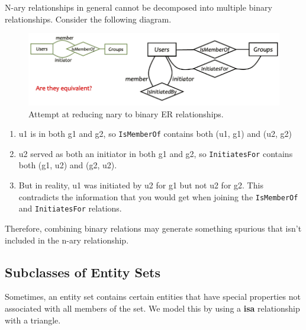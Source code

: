 \documentclass{article}
\begin{document}
      \begin{example}
        N-ary relationships in general cannot be decomposed into multiple binary relationships. Consider the following diagram. 
        \begin{figure}[H]
          \centering 
          \includegraphics[scale=0.4]{img/nary_vs_binary.png}
          \caption{Attempt at reducing nary to binary ER relationships. } 
          \label{fig:}
        \end{figure}
        \begin{enumerate}
          \item u1 is in both g1 and g2, so \texttt{IsMemberOf} contains both (u1, g1) and (u2, g2)
          \item u2 served as both an initiator in both g1 and g2, so \texttt{InitiatesFor} contains both (g1, u2) and (g2, u2). 
          \item But in reality, u1 was initiated by u2 for g1 but not u2 for g2. This contradicts the information that you would get when joining the \texttt{IsMemberOf} and \texttt{InitiatesFor} relations. 
        \end{enumerate}
        Therefore, combining binary relations may generate something spurious that isn't included in the n-ary relationship. 
      \end{example}

  \subsection{Subclasses of Entity Sets}

    Sometimes, an entity set contains certain entities that have special properties not associated with all members of the set. We model this by using a \textbf{isa} relationship with a triangle. 
    
\end{document}
